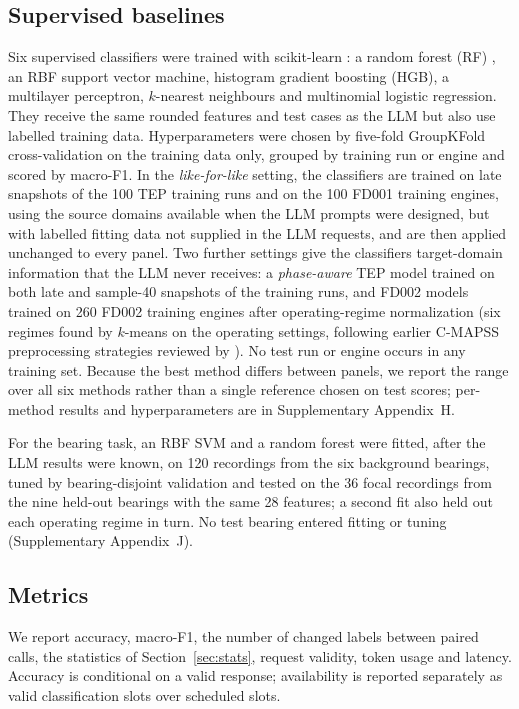 \documentclass[11pt,a4paper]{article}
\begin{document}
\subsection{Supervised baselines}
Six supervised classifiers were trained with scikit-learn \citep{pedregosa2011scikit}: a random forest (RF) \citep{breiman2001random}, an RBF support vector machine, histogram gradient boosting (HGB), a multilayer perceptron, $k$-nearest neighbours and multinomial logistic regression. They receive the same rounded features and test cases as the LLM but also use labelled training data. Hyperparameters were chosen by five-fold GroupKFold cross-validation on the training data only, grouped by training run or engine and scored by macro-F1. In the \emph{like-for-like} setting, the classifiers are trained on late snapshots of the 100 TEP training runs and on the 100 FD001 training engines, using the source domains available when the LLM prompts were designed, but with labelled fitting data not supplied in the LLM requests, and are then applied unchanged to every panel. Two further settings give the classifiers target-domain information that the LLM never receives: a \emph{phase-aware} TEP model trained on both late and sample-40 snapshots of the training runs, and FD002 models trained on 260 FD002 training engines after operating-regime normalization (six regimes found by $k$-means on the operating settings, following earlier C-MAPSS preprocessing strategies reviewed by \citet{ramasso2014benchmarking}). No test run or engine occurs in any training set. Because the best method differs between panels, we report the range over all six methods rather than a single reference chosen on test scores; per-method results and hyperparameters are in Supplementary Appendix~H.

For the bearing task, an RBF SVM and a random forest were fitted, after the LLM results were known, on 120 recordings from the six background bearings, tuned by bearing-disjoint validation and tested on the 36 focal recordings from the nine held-out bearings with the same 28 features; a second fit also held out each operating regime in turn. No test bearing entered fitting or tuning (Supplementary Appendix~J).

\subsection{Metrics}
We report accuracy, macro-F1, the number of changed labels between paired calls, the statistics of Section~\ref{sec:stats}, request validity, token usage and latency. Accuracy is conditional on a valid response; availability is reported separately as valid classification slots over scheduled slots.
\end{document}
